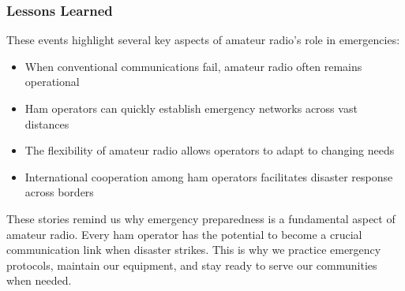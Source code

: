 \subsubsection*{Lessons Learned}
These events highlight several key aspects of amateur radio's role in emergencies:
\begin{itemize}[noitemsep]
    \item When conventional communications fail, amateur radio often remains operational
    \item Ham operators can quickly establish emergency networks across vast distances
    \item The flexibility of amateur radio allows operators to adapt to changing needs
    \item International cooperation among ham operators facilitates disaster response across borders
\end{itemize}

These stories remind us why emergency preparedness is a fundamental aspect of amateur radio. Every ham operator has the potential to become a crucial communication link when disaster strikes. This is why we practice emergency protocols, maintain our equipment, and stay ready to serve our communities when needed.
